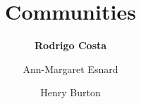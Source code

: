 %
%
%


%
%
%
%
%
%
%
%

\title{Communities}
\author{
    \textbf{Rodrigo Costa}
    \and{Ann-Margaret Esnard}
    \and{Henry Burton}}
\tocauthor{}
%
%
\maketitle

